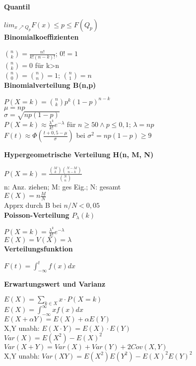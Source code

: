 \documentclass[10pt,twocolumn,a4paper]{article}
\begin{document}
\begin{flushleft}
\textbf{Quantil}

$lim_{x\nearrow Q_p}F(x) \leq p \leq F(Q_p)$\\

\textbf{Binomialkoeffizienten}

$\binom{n}{k} = \frac{n!}{k!(n-k)!}$; $0! = 1$\\
$\binom{n}{k} = 0$ für k>n\\
$\binom{n}{0} = \binom{n}{n} = 1$; $\binom{n}{1} = n$\\

\textbf{Binomialverteilung B(n,p)}

$P(X=k) = \binom{n}{k}p^k(1-p)^{n-k}$\\
$\mu = np$\\
$\sigma = \sqrt{np(1-p)}$\\
$P(X=k) \approx \frac{\lambda^k}{k!}e^{-\lambda}$ für $n \geq 50 \wedge p \leq 0,1$; $\lambda = np$\\
$F(t) \approx \Phi(\frac{t+0,5-\mu}{\sigma})$ bei $\sigma^2 = np(1-p) \geq 9$

\textbf{Hypergeometrische Verteilung H(n, M, N)}

$P(X=k) = \frac{\binom{M}{k}\binom{N-M}{n-k}}{\binom{N}{n}}$\\
n: Anz. ziehen; M: ges Eig.; N: gesamt\\
$E(X) = n\frac{M}{N}$\\
Apprx durch B bei $n/N < 0,05$\\

\textbf{Poisson-Verteilung $P_\lambda(k)$}

$P(X=k) = \frac{\lambda^k}{k!}e^{-\lambda}$\\
$E(X) = V(X) = \lambda$\\

\textbf{Verteilungsfunktion}

$F(t) = \int_{-\infty}^t f(x) dx$

\textbf{Erwartungswert und Varianz}

$E(X) = \sum_{k \in X} x \cdot P(X=k)$\\
$E(X) = \int_{-\infty}^{\infty} xf(x) dx$\\
$E(X + \alpha Y) = E(X) + \alpha E(Y)$\\
X,Y unabh: $E(X \cdot Y) = E(X) \cdot E(Y)$\\

$Var(X) = E(X^2) - E(X)^2$\\
$Var(X+Y) = Var(X) + Var(Y) + 2 Cov(X,Y)$\\
X,Y unabh: $Var(XY) = E(X^2)E(Y^2) - E(X)^2E(Y)^2$\\


\end{flushleft}
\end{document}
